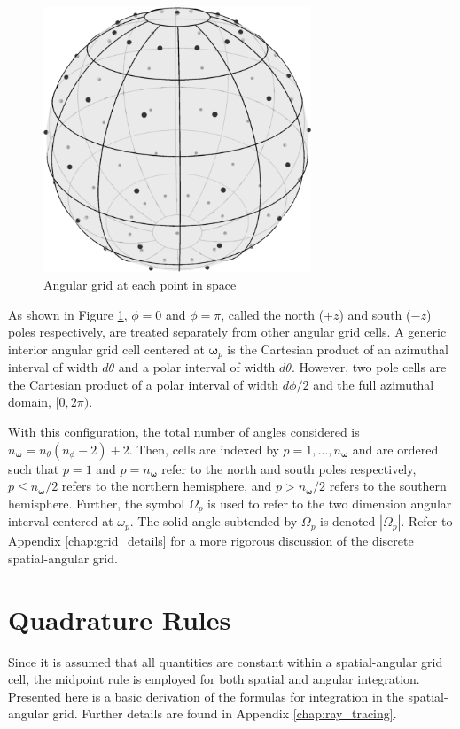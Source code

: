 \documentclass[ms,cpyr,lof,lot]{uathesis}
\newcommand\abs[1]{\left| #1 \right|}
\renewcommand\vec\bm
\newcommand\nomega{{n_{\vec{\omega}}}}
\begin{document}
\begin{figure}[H]
  \centering
  \includegraphics[width=8cm]{angulargrid.pdf}
  \caption{Angular grid at each point in space}
  \label{fig:angular_grid}
\end{figure}

As shown in Figure \ref{fig:angular_grid}, $\phi=0$ and $\phi=\pi$, called
the north ($+z$) and south ($-z$) poles respectively, are treated separately from other angular grid cells.
A generic interior angular grid cell centered at $\vec{\omega}_p$ is the Cartesian product of an azimuthal interval of width $d\theta$ and a polar interval of width $d\theta$.
However, two pole cells are the Cartesian product of a polar interval of width $d\phi/2$ and the full azimuthal domain, $[0, 2\pi)$.

With this configuration, the total number of angles considered is $\nomega = n_\theta(n_\phi-2)+2$.
Then, cells are indexed by $p=1,\ldots,n_{\vec{\omega}}$ and are ordered such that
$p=1$ and $p=n_{\vec{\omega}}$ refer to the north and south poles respectively,
$p\leq\nomega/2$ refers to the northern hemisphere, and $p>\nomega/2$ refers to the southern hemisphere.
Further, the symbol $\Omega_p$ is used to refer to the two dimension angular interval centered at $\omega_p$.
The solid angle subtended by $\Omega_p$ is denoted $\abs{\Omega_p}$.
Refer to Appendix \ref{chap:grid_details} for a more rigorous discussion of the discrete spatial-angular grid.

\section{Quadrature Rules}
Since it is assumed that all quantities are constant within a spatial-angular grid cell,
the midpoint rule is employed for both spatial and angular integration.
Presented here is a basic derivation of the formulas for integration in the spatial-angular grid.
Further details are found in Appendix \ref{chap:ray_tracing}.
\end{document}
